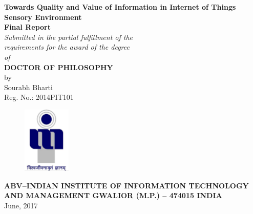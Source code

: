\baselineskip=22pt
\begin{center}
{\bf \large{{\textup{\textbf{\textup{{Towards Quality and Value of Information in Internet of Things Sensory Environment}}}}}}
\\[0.4in]}
{\bf{\bf Final Report}}\\[0.2in]
\emph{Submitted in the partial fulfillment of the\\
requirements for the award of the degree\\[0.2in]
of\\[0.2in]
}{\bf {{DOCTOR OF PHILOSOPHY}}}\\[0.5in]
by\\[0.2in]
{ {Sourabh Bharti}}\\[0.1in]
{Reg. No.: 2014PIT101}\\
\vspace{0.7in}
\begin{figure}[ht]
\centering
\includegraphics[height=1.25in,width=0.9in]{logo.pdf}\\
\end{figure}\vspace{0.8in}
{{\bf ABV--INDIAN INSTITUTE OF INFORMATION TECHNOLOGY AND MANAGEMENT GWALIOR (M.P.) -- 474015 INDIA\\[0.2in]}
}June, 2017
\end{center}
\newpage
